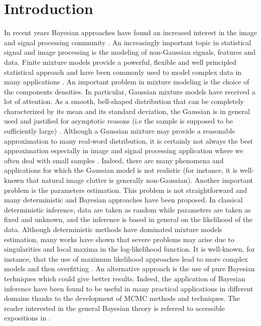 \documentclass[journal,10pt]{elsart}
\begin{document}
\section{Introduction}
In recent years Bayesian approaches have found an increased interest in the image and signal processing community \cite{Fitzgerald99}.
An increasingly important topic in statistical signal and image processing is the modeling of non-Gaussian signals, features and data.
Finite mixture models provide a powerful, flexible and well principled statistical approach and have been commonly used to model complex data in many applications \cite{McLachlan2000}.
An important problem in mixture modeling is the choice of the components densities.
In particular, Gaussian mixture models have received a lot of attention.
As a smooth, bell-shaped distribution that can be completely characterized by its mean and its standard deviation, the Gaussian is in general used and justified for asymptotic reasons (i.e the sample is supposed to be sufficiently large) \cite{Robert2007}.
Although a Gaussian mixture may provide a reasonable approximation to many real-word distribution, it is certainly not always the best approximation especially in image and signal processing application where we often deal with small samples \cite{Meignen2006}.
Indeed, there are many phenomena and applications for which the Gaussian model is not realistic (for instance, it is well-known that natural image clutter is generally non-Gaussian).
Another important problem is the parameters estimation.
This problem is not straightforward and many deterministic and Bayesian approaches have been proposed.
In classical deterministic inference, data are taken as random while parameters are taken as fixed and unknown, and the inference is based in general on the likelihood of the data.
Although deterministic methods have dominated mixture models estimation, many works have shown that severe problems may arise due to singularities and local maxima in the log-likelihood function.
It is well-known, for instance, that the use of maximum likelihood approaches lead to more complex models and then overfitting \cite{Robert2007}.
An alternative approach is the use of pure Bayesian techniques which could give better results.
Indeed, the application of Bayesian inference have been found to be useful in many practical applications in different domains thanks to the development of MCMC methods and techniques.
The reader interested in the general Bayesian theory is referred to accessible expositions in \cite{Ghosh2006,Robert2007}. \\
\end{document}
